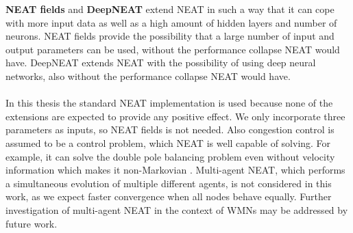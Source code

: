 \textbf{NEAT fields} and \textbf{DeepNEAT} extend NEAT in such a way that it can cope with more input data as well as a high amount of hidden layers and number of neurons. NEAT fields \cite{neatfields} provide the possibility that a large number of input and output parameters can be used, without the performance collapse NEAT would have. DeepNEAT \cite{deepneat} extends NEAT with the possibility of using deep neural networks, also without the performance collapse NEAT would have. \\
\\
In this thesis the standard NEAT implementation is used because none of the extensions are expected to provide any positive effect. We only incorporate three parameters as inputs, so NEAT fields is not needed. Also congestion control is assumed to be a control problem, which NEAT is well capable of solving. For example, it can solve the double pole balancing problem even without velocity information which makes it non-Markovian \cite{neat}. Multi-agent NEAT, which performs a simultaneous evolution of multiple different agents, is not considered in this work, as we expect faster convergence when all nodes behave equally. Further investigation of multi-agent NEAT in the context of WMNs may be addressed by future work.

